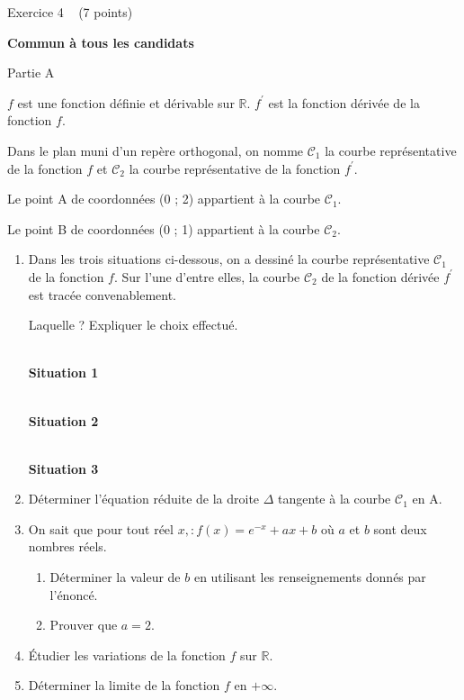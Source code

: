 
%
\begin{h2}Exercice 4   (7 points)\end{h2}
\textbf{Commun  à tous les candidats}
\begin{h3}Partie A\end{h3}
$f$ est une fonction définie et dérivable sur $\mathbb{R}$. $f^{\prime}$ est la fonction dérivée de la fonction $f$.
\par
Dans le plan muni d'un repère orthogonal, on nomme $\mathscr C_{1}$ la courbe représentative de la fonction $f$ et $\mathscr C_{2}$ la courbe représentative de la fonction $f^{\prime}$.
\par
Le point A de coordonnées (0 ; 2) appartient à la courbe $\mathscr C_{1}$.
\par
Le point B de coordonnées (0 ; 1) appartient à la courbe $\mathscr C_{2}$.
\begin{enumerate}
     \item
     Dans les trois situations ci-dessous, on a dessiné la courbe représentative $\mathscr C_{1}$ de la fonction $f$. Sur l'une d'entre elles, la courbe $\mathscr C_{2}$ de la fonction dérivée $f^{\prime}$ est tracée convenablement.
     \par
     Laquelle ? Expliquer le choix effectué.
\begin{center}
\\ \textbf{Situation 1}\end{center}
\medskip
\begin{center}
\\ \textbf{Situation 2}\end{center}
\medskip
\begin{center}
\\ \textbf{Situation 3}\end{center}
     \item
     Déterminer l'équation réduite de la droite $\Delta $ tangente à la courbe $\mathscr C_{1}$ en A.
     \item
     On sait que pour tout réel $x,: f\left(x\right)=e^{-x}+ax+b$ où $a$ et $b$ sont deux nombres réels.
     \begin{enumerate}[label=\alph*.]
          \item
          Déterminer la valeur de $b$ en utilisant les renseignements donnés par l'énoncé.
          \item
     Prouver que $a=2$.\end{enumerate}
     \item
     Étudier les variations de la fonction $f$ sur $\mathbb{R}$.
     \item
     Déterminer la limite de la fonction $f$ en $+ \infty $.
\end{enumerate}
